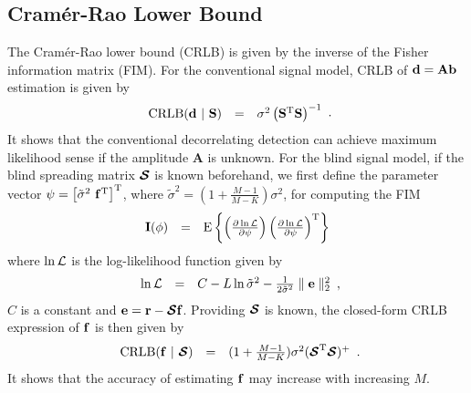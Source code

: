 \documentclass[a4paper,10pt,fleqn, twocolumn]{IEEETran}
\newcommand{\br}{{\mathbf r}}
\newcommand{\bA}{{\mathbf A}}
\newcommand{\bb}{{\bf b}}
\newcommand{\bd}{{\bf d}}
\newcommand{\bbf}{{\bf f}}
\newcommand{\bS}{{\bf S}}
\newcommand{\bI}{{\bf I}}
\newcommand{\bcS}{{\mbox {\boldmath ${\cal S}$}}}
\begin{document}
\subsection{Cram\'{e}r-Rao Lower Bound} The Cram\'{e}r-Rao lower
bound (CRLB) is given by the inverse of the Fisher information
matrix (FIM). For the conventional signal model, CRLB of
$\bd=\bA\bb$ estimation is given by
\begin{equation}
\begin{array}{rcl}
{\rm CRLB}(\bd\ |\ \bS)&=&\sigma^{2}\left(\bS^{\rm
T}\bS\right)^{\rm -1}
\end{array}.\label{CRLB_b}
\end{equation}
\noindent It shows that the conventional decorrelating detection
can achieve maximum likelihood sense if the amplitude $\bA$ is
unknown. For the blind signal model, if the blind spreading matrix
$\bcS$ is known beforehand, we first define the parameter vector
$\mathbf{\psi} = \left[\tilde{\sigma}^{2}\ \bbf^{\rm
T}\right]^{\rm T}$, where $\tilde{\sigma}^{2}
=(1+\frac{M-1}{M-K})\sigma^{2}$, for computing the FIM
\begin{equation}
\begin{array}{rcl}
{\bI(\mathbf{\phi})} &=& {\rm E} \left\{ \left( \frac{\partial
\ln{\cal L}}{\partial \mathbf{\psi}} \right) \left( \frac{\partial
\ln{\cal L}}{\partial \mathbf{\psi}} \right)^{\rm T} \right\}
\label{fim}
\end{array}
\end{equation}
\noindent where $\ln{\cal L}$ is the log-likelihood function given
by
\begin{equation}
\begin{array}{rcl}
\ln{\cal
L}&=&C-L\ln\tilde{\sigma}^2-\frac{1}{2\tilde{\sigma}^2}\parallel\mathbf{e}\parallel_2^2
\end{array},\label{logl}
\end{equation}
\noindent $C$ is a constant and $\mathbf{e}=\br-\bcS\bbf$.
Providing $\bcS$ is known, the closed-form CRLB expression of
$\bbf$ is then given by
\begin{equation}
\begin{array}{rcl}
{\rm CRLB}(\bbf\ |\ \bcS) &
=&(1+\frac{M-1}{M-K})\sigma^{2}(\bcS^{\rm T}\bcS)^{\rm +}
\end{array}.\label{CRLB_f}
\end{equation}
\noindent It shows that the accuracy of estimating $\bbf$ may
increase with increasing $M$.
\end{document}
